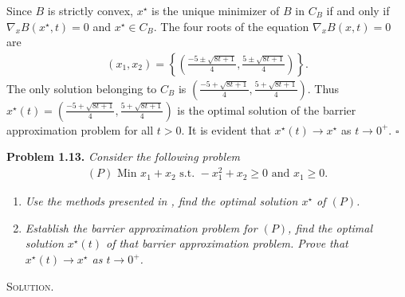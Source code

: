 \documentclass[a4paper]{article}
\numberwithin{equation}{section}
\begin{document}
\begin{enumerate}
Since $B$ is strictly convex, $x^\star$ is the unique minimizer of $B$ in $C_B$ if and only if $\nabla _x B\left( {{x^\star},t} \right) = 0$ and $x^\star \in C_B$. The four roots of the equation $\nabla _x B\left( {x,t} \right) = 0$ are 
\begin{align}
\left( {{x_1},{x_2}} \right) = \left\{ {\left( {\frac{{ - 5 \pm \sqrt {8t + 1} }}{4},\frac{{5 \pm \sqrt {8t + 1} }}{4}} \right)} \right\} .
\end{align}
The only solution belonging to $C_B$ is $\left( {\frac{{ - 5 + \sqrt {8t + 1} }}{4},\frac{{5 + \sqrt {8t + 1} }}{4}} \right)$. Thus $x^\star \left(t\right) = \left( {\frac{{ - 5 + \sqrt {8t + 1} }}{4},\frac{{5 + \sqrt {8t + 1} }}{4}} \right)$ is the optimal solution of the barrier approximation problem for all $t>0$. It is evident that $x^\star \left(t\right)\to x^\star$ as $t\to 0^+$. \hfill $\square$
\end{enumerate} 
\textbf{Problem 1.13.} \textit{Consider the following problem}
\begin{align}
\left( P \right) \mbox{ Min } {x_1} + {x_2} \mbox{ s.t. }- x_1^2 + {x_2} \ge 0 \mbox{ and } {x_1} \ge 0.
\end{align}
\begin{enumerate}
\item \textit{Use the methods presented in \cite{2}, find the optimal solution $x^\star$ of $\left(P\right)$.}
\item \textit{Establish the barrier approximation problem for $\left(P\right)$, find the optimal solution $x^\star \left(t\right)$ of that barrier approximation problem. Prove that $x^\star \left(t\right)\to x^\star$ as $t\to 0^+$.}
\end{enumerate}
\textsc{Solution.}
\end{document}
